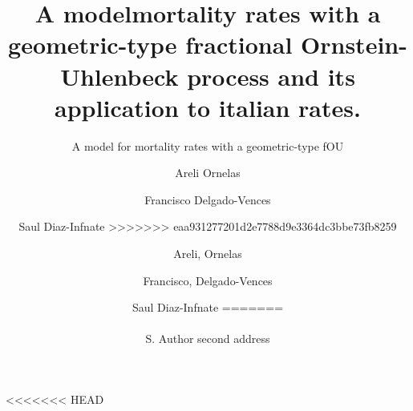 \documentclass[smallextended]{svjour3}
\begin{document}
    \title{A modelmortality rates with a geometric-type fractional 
        Ornstein-Uhlenbeck process and its application to  italian rates.}
    
    \subtitle{A model for mortality rates with a geometric-type fOU}
    
<<<<<<< HEAD
    
    \author{Areli, Ornelas
        \and
        Francisco, Delgado-Vences
        \and
        Saul Diaz-Infnate%
=======
    \author{Areli Ornelas
        \and
        Francisco Delgado-Vences
        \and
        Saul Diaz-Infnate
>>>>>>> eaa931277201d2e7788d9e3364dc3bbe73fb8259
    }
    
    
        \\
        S. Author \at
        second address
    }
    
\end{document}
